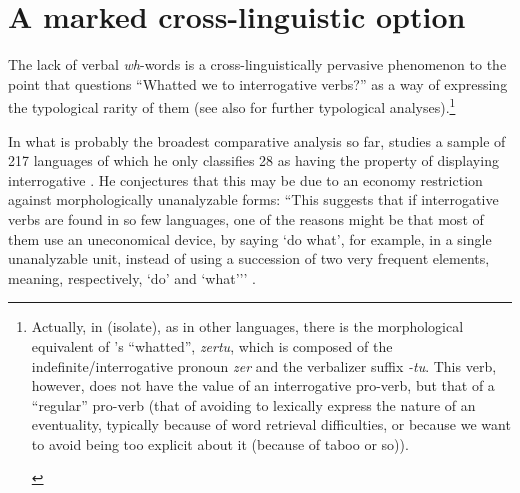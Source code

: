 \documentclass[output=paper]{langsci/langscibook}
\begin{document}
\section{A marked cross-linguistic option} \label{sec:2}

The lack of verbal \emph{wh}-words is a cross-linguistically pervasive
phenomenon to the point that \citet{hagege2003} questions ``Whatted we to
interrogative verbs?'' as a way of expressing the typological rarity of them
(see also \citealt{hagege2008,idiatov.vanderauwera2004} for further
typological analyses).\footnote{Actually, in  (isolate), as in other
    languages, there is the morphological equivalent of
    \citeauthor{hagege2003}'s \citeyearpar{hagege2003} ``whatted'',
    \emph{zertu}, which is composed of the indefinite/interrogative pronoun
    \emph{zer} and the verbalizer suffix \emph{-tu}. This verb, however,
    does not have the value of an interrogative pro-verb, but that of a
    ``regular'' pro-verb (that of avoiding to lexically express the nature of an
    eventuality, typically because of word retrieval difficulties, or because
    we want to avoid being too explicit about it (because of taboo or so)).

\label{fn:15.2}}

In what is probably the broadest comparative analysis so far,
\citet{hagege2008} studies a sample of 217 languages of which he only
classifies 28 as having the property of displaying interrogative . He
conjectures that this may be due to an economy restriction against
morphologically unanalyzable forms: ``This suggests that if interrogative verbs
are found in so few languages, one of the reasons might be that most of them
use an uneconomical device, by saying `do what’, for example, in a single
unanalyzable unit, instead of using a succession of two very frequent elements,
meaning, respectively, `do’ and `what’'' \citep[30]{hagege2008}.
\end{document}
